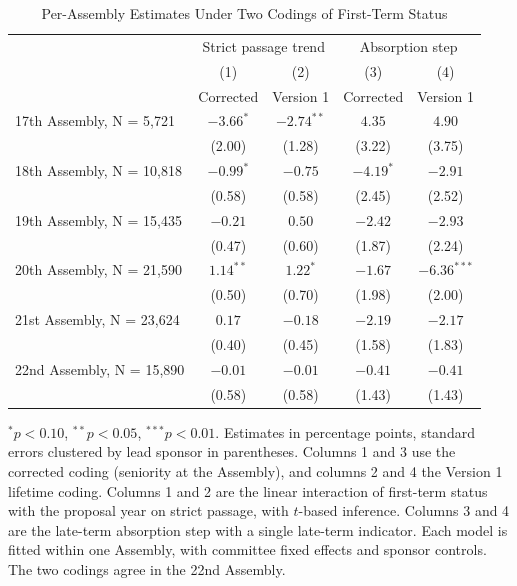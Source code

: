 \documentclass[11pt]{article}
\begin{document}
\begin{table}[H]
\centering
\singlespacing
\caption{Per-Assembly Estimates Under Two Codings of First-Term Status}
\label{tab:perassembly}
\small
\begin{tabular}{lcccc}
\toprule
& \multicolumn{2}{c}{Strict passage trend} & \multicolumn{2}{c}{Absorption step} \\
& (1) & (2) & (3) & (4) \\
& Corrected & Version 1 & Corrected & Version 1 \\
\midrule
17th Assembly, N = 5,721 & $-3.66^{*}$ & $-2.74^{**}$ & $4.35$ & $4.90$ \\
& (2.00) & (1.28) & (3.22) & (3.75) \\
18th Assembly, N = 10,818 & $-0.99^{*}$ & $-0.75$ & $-4.19^{*}$ & $-2.91$ \\
& (0.58) & (0.58) & (2.45) & (2.52) \\
19th Assembly, N = 15,435 & $-0.21$ & $0.50$ & $-2.42$ & $-2.93$ \\
& (0.47) & (0.60) & (1.87) & (2.24) \\
20th Assembly, N = 21,590 & $1.14^{**}$ & $1.22^{*}$ & $-1.67$ & $-6.36^{***}$ \\
& (0.50) & (0.70) & (1.98) & (2.00) \\
21st Assembly, N = 23,624 & $0.17$ & $-0.18$ & $-2.19$ & $-2.17$ \\
& (0.40) & (0.45) & (1.58) & (1.83) \\
22nd Assembly, N = 15,890 & $-0.01$ & $-0.01$ & $-0.41$ & $-0.41$ \\
& (0.58) & (0.58) & (1.43) & (1.43) \\
\bottomrule
\end{tabular}

\smallskip
\begin{minipage}{0.95\textwidth}
\footnotesize $^{*}p<0.10$, $^{**}p<0.05$, $^{***}p<0.01$. Estimates in percentage points, standard errors clustered by lead sponsor in parentheses. Columns 1 and 3 use the corrected coding (seniority at the Assembly), and columns 2 and 4 the Version 1 lifetime coding. Columns 1 and 2 are the linear interaction of first-term status with the proposal year on strict passage, with $t$-based inference. Columns 3 and 4 are the late-term absorption step with a single late-term indicator. Each model is fitted within one Assembly, with committee fixed effects and sponsor controls. The two codings agree in the 22nd Assembly.
\end{minipage}
\end{table}
\end{document}
